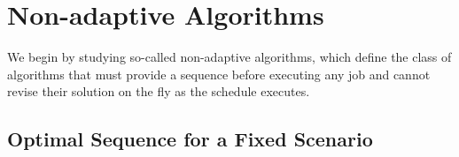 \documentclass{article}
\newtheorem{theorem}{Theorem}
\newcommand{\W}{\mathbb{W}}
\newcommand{\E}{\mathbb{E}}
\begin{document}





\section{Non-adaptive Algorithms}

We begin by studying so-called non-adaptive algorithms, which define the class of algorithms that must provide a sequence before executing any job and cannot revise their solution on the fly as the schedule executes.

\subsection{Optimal Sequence for a Fixed Scenario}
\end{document}
